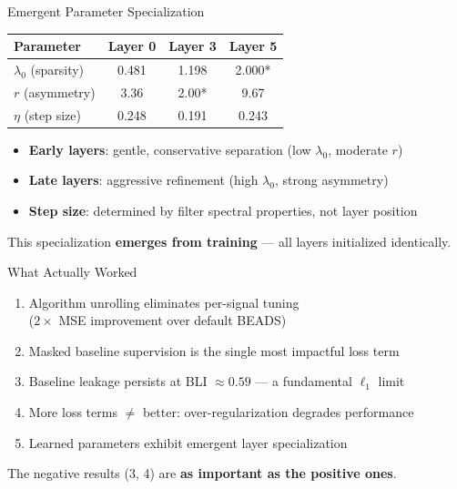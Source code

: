 \documentclass[aspectratio=169, 10pt]{beamer}
\newcommand{\cmark}{\textcolor{forestgreen}{\ding{51}}}
\newcommand{\xmark}{\textcolor{warningred}{\ding{55}}}
\newcommand{\wmark}{\textcolor{orange}{\ding{115}}}
\begin{document}
\begin{frame}{Emergent Parameter Specialization}
\centering
\begin{tabular}{lccc}
\toprule
\textbf{Parameter} & \textbf{Layer 0} & \textbf{Layer 3} & \textbf{Layer 5} \\
\midrule
$\lambda_0$ (sparsity)   & 0.481 & 1.198 & 2.000* \\
$r$ (asymmetry)           & 3.36  & 2.00* & 9.67 \\
$\eta$ (step size)        & 0.248 & 0.191 & 0.243 \\
\bottomrule
\end{tabular}

\vspace{0.8em}
\begin{itemize}
  \setlength\itemsep{0.4em}
  \item \textbf{Early layers}: gentle, conservative separation (low $\lambda_0$, moderate $r$)
  \item \textbf{Late layers}: aggressive refinement (high $\lambda_0$, strong asymmetry)
  \item \textbf{Step size}: determined by filter spectral properties, not layer position
\end{itemize}

\vspace{0.5em}
\begin{resultgood}
\centering
This specialization \textbf{emerges from training} --- all layers initialized identically.
\end{resultgood}
\end{frame}

\begin{frame}{What Actually Worked}
\begin{enumerate}
  \setlength\itemsep{0.7em}
  \item[\cmark] Algorithm unrolling eliminates per-signal tuning\\
    {\small ($2\times$ MSE improvement over default BEADS)}
  \item[\cmark] Masked baseline supervision is the single most impactful loss term
  \item[\wmark] Baseline leakage persists at BLI $\approx 0.59$ --- a fundamental $\ell_1$ limit
  \item[\xmark] More loss terms $\neq$ better: over-regularization degrades performance
  \item[\cmark] Learned parameters exhibit emergent layer specialization
\end{enumerate}

\vspace{0.8em}
\begin{insightbox}
\centering
The negative results (3, 4) are \textbf{as important as the positive ones}.
\end{insightbox}
\end{frame}
\end{document}
